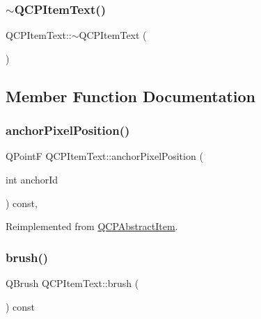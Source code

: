 \subsubsection{\texorpdfstring{$\sim$QCPItemText()}{~QCPItemText()}}
{\footnotesize\ttfamily Q\+C\+P\+Item\+Text\+::$\sim$\+Q\+C\+P\+Item\+Text (\begin{DoxyParamCaption}{ }\end{DoxyParamCaption})\hspace{0.3cm}{\ttfamily [virtual]}}



\subsection{Member Function Documentation}
\mbox{\label{class_q_c_p_item_text_afcdb1724d88d561f65da95fb54b0acb7}} 
\subsubsection{\texorpdfstring{anchorPixelPosition()}{anchorPixelPosition()}}
{\footnotesize\ttfamily Q\+PointF Q\+C\+P\+Item\+Text\+::anchor\+Pixel\+Position (\begin{DoxyParamCaption}\item[{int}]{anchor\+Id }\end{DoxyParamCaption}) const\hspace{0.3cm}{\ttfamily [protected]}, {\ttfamily [virtual]}}



Reimplemented from \mbox{\hyperlink{class_q_c_p_abstract_item_ada5bad4e1196c4fc0d0d12328e24b8f2}{Q\+C\+P\+Abstract\+Item}}.

\mbox{\label{class_q_c_p_item_text_a2600b9b419f17e2e2381f5ed8267da62}} 
\subsubsection{\texorpdfstring{brush()}{brush()}}
{\footnotesize\ttfamily Q\+Brush Q\+C\+P\+Item\+Text\+::brush (\begin{DoxyParamCaption}{ }\end{DoxyParamCaption}) const\hspace{0.3cm}{\ttfamily [inline]}}

